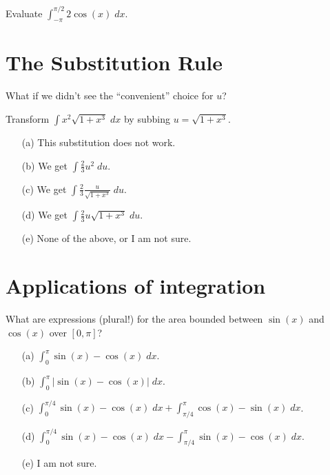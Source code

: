 \documentclass[14pt]{beamer}
\begin{document}
\begin{frame}
  Evaluate \(\int_{-\pi}^{\pi/2} 2 \cos(x) \;dx\).
\end{frame}

\section{The Substitution Rule}
\begin{frame}[t]
  What if we didn't see the ``convenient'' choice for \(u\)? 

  Transform \(\int x^{2} \sqrt{ 1 + x^{3} } \;dx\) by subbing \(u = \sqrt{ 1 + x^{3} }\).

  \begin{enumerate} \setlength\itemsep{1ex}
    \item[(a)] This substitution does not work.
    \item[(b)] We get \(\int \frac{2}{3} u^{2} \;du\). 
    \item[(c)] We get \(\int \frac{2}{3} \frac{u}{\sqrt{ 1 + x^{3} }} \;du\). 
  \item[(d)] We get \(\int \frac{2}{3} u \sqrt{1 + x^{3}} \;du\). 
    \item[(e)] None of the above, or I am not sure.
  \end{enumerate}
\end{frame}

\section{Applications of integration}

\begin{frame}[t]
  What are expressions (plural!) for the area bounded between \(\sin(x)\) and \(\cos(x)\) over \([0, \pi]\)?

  \begin{enumerate} \setlength\itemsep{1ex}
    \item[(a)] \(\int_{0}^{\pi} \sin(x) - \cos(x) \;dx\).
    \item[(b)] \(\int_{0}^{\pi} |\sin(x) - \cos(x)| \;dx\).
    \item[(c)] \(\int_{0}^{\pi/4} \sin(x) - \cos(x) \;dx + \int_{\pi/4}^{\pi} \cos(x) - \sin(x) \;dx\).
    \item[(d)] \(\int_{0}^{\pi/4} \sin(x) - \cos(x) \;dx - \int_{\pi/4}^{\pi} \sin(x) - \cos(x) \;dx\).
    \item[(e)] I am not sure. 
  \end{enumerate}
\end{frame}
\end{document}
